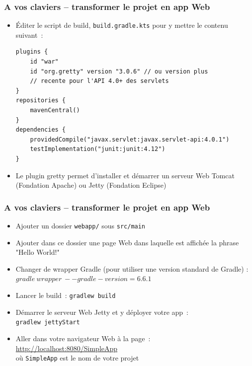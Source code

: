 \documentclass{beamer}
\begin{document}
\begin{frame}[fragile]
	\frametitle{A vos claviers -- transformer le projet en app Web}
	
	\begin{itemize}
		\item Éditer le script de build, \texttt{build.gradle.kts} pour y mettre le contenu suivant~:
		\footnotesize
\begin{lstlisting}
plugins {
	id "war"
	id "org.gretty" version "3.0.6" // ou version plus
	// recente pour l'API 4.0+ des servlets
}		
repositories {
	mavenCentral()
}
dependencies {
	providedCompile("javax.servlet:javax.servlet-api:4.0.1")
	testImplementation("junit:junit:4.12")
}	
\end{lstlisting}
		\normalsize
		\item[] Le plugin gretty permet d'installer et démarrer un serveur Web Tomcat (Fondation Apache) ou Jetty (Fondation Eclipse)
		
	\end{itemize}
\end{frame}

\begin{frame}
	\frametitle{A vos claviers -- transformer le projet en app Web}
	
	\begin{itemize}
		\item Ajouter un dossier \texttt{webapp/} sous \texttt{src/main}
		\item Ajouter dans ce dossier une page Web dans laquelle est affichée la phrase "Hello World!"
		\item Changer de wrapper Gradle (pour utiliser une version standard de Gradle) :
		$gradle~wrapper~--gradle-version=6.6.1$
		\item Lancer le build~: \texttt{gradlew build}
		\item Démarrer le serveur Web Jetty et y déployer votre app~:\\
		\texttt{gradlew jettyStart}
		\item Aller dans votre navigateur Web à la page~:\\
		\url{http://localhost:8080/SimpleApp}\\
		où \texttt{SimpleApp} est le nom de votre projet
	\end{itemize}
\end{frame}
\end{document}
